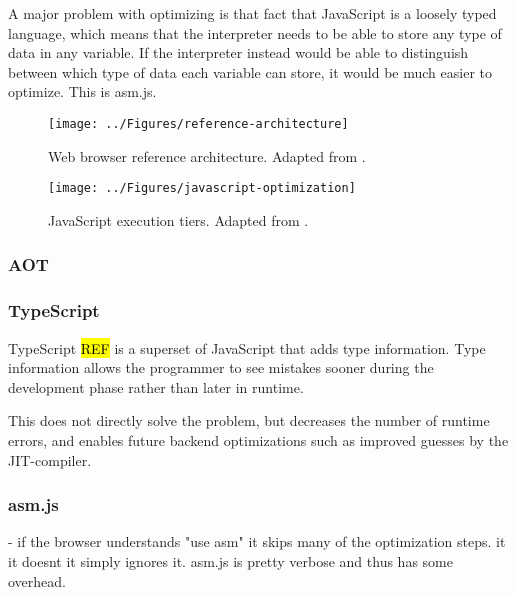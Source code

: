 A major problem with optimizing is that fact that JavaScript is a loosely typed language, which means that the interpreter needs to be able to store any type of data in any variable. If the interpreter instead would be able to distinguish between which type of data each variable can store, it would be much easier to optimize. This is asm.js.

\clearpage

\begin{figure}[!h]
\centering
\texttt{[image: ../Figures/reference-architecture]}
\caption{Web browser reference architecture. Adapted from \textcite{GrosskurthGodfrey2005}.}
\label{reference-architecture}
\end{figure}

\begin{figure}[!h]
\centering
\texttt{[image: ../Figures/javascript-optimization]}
\caption{JavaScript execution tiers. Adapted from \textcite{ParkKimMoon2017}.}
\label{javascript-optimization}
\end{figure}

\subsubsection*{AOT}

\subsubsection*{TypeScript}

TypeScript \hl{REF} is a superset of JavaScript that adds type information. Type information allows the programmer to see mistakes sooner during the development phase rather than later in runtime.



This does not directly solve the problem, but decreases the number of runtime errors, and enables future backend optimizations such as improved guesses by the JIT-compiler.

\subsubsection{asm.js}

- if the browser understands "use asm" it skips many of the optimization steps. it it doesnt it simply ignores it. asm.js is pretty verbose and thus has some overhead.

